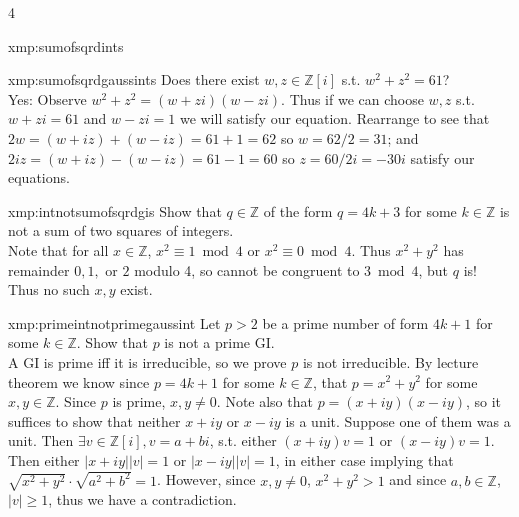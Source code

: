 \documentclass[landscape, 8pt]{extarticle}
\begin{document}
\begin{multicols*}{4}
\begin{xmp}{xmp:sumofsqrdints}{ }
		\end{xmp}
		
		
		\begin{xmp}{xmp:sumofsqrdgaussints}{ }
			Does there exist $w, z\in \mathbb{Z}[i]$ s.t. $w^2 + z^2 = 61$?\\
			Yes: Observe $w^2 + z^2 = (w+zi)(w-zi)$. Thus if we can choose $w, z$ s.t. $w+zi = 61$ and $w-zi = 1$ we will satisfy our equation. Rearrange to see that $2w = (w+iz)+(w-iz) = 61 + 1 = 62$ so $w = 62/2 = 31$; and $2iz = (w+iz) - (w-iz) = 61-1 = 60$ so $z = 60/2i = -30i$ satisfy our equations.
			
		\end{xmp}
		
		
		\begin{xmp-s}{xmp:intnotsumofsqrdgis}{ }
			Show that $q\in \mathbb{Z}$ of the form $q = 4k + 3$ for some $k\in \mathbb{Z}$ is not a sum of two squares of integers.\\
			Note that for all $x\in \mathbb{Z}$, $x^2 \equiv 1 \bmod{4}$ or $x^2 \equiv 0 \bmod{4}$. Thus $x^2 + y^2$ has remainder $0, 1, \text{ or } 2$ modulo 4, so cannot be congruent to $3 \bmod{4}$, but $q$ is! Thus no such $x, y$ exist.
			
		\end{xmp-s}
		
		
		\begin{xmp-s}{xmp:primeintnotprimegaussint}{ }
			Let $p > 2$ be a prime number of form $4k+1$ for some $k\in \mathbb{Z}$. Show that $p$ is not a prime GI.\\
			A GI is prime iff it is irreducible, so we prove $p$ is not irreducible. By lecture theorem we know since $p = 4k+1$ for some $k\in \mathbb{Z}$, that $p = x^2 + y^2$ for some $x, y\in \mathbb{Z}$. Since $p$ is prime, $x, y \ne 0$. Note also that $p = (x+iy)(x-iy)$, so it suffices to show that neither $x+iy$ or $x-iy$ is a unit. Suppose one of them was a unit. Then $\exists v\in \mathbb{Z}[i], v = a+bi$, s.t. either $(x+iy)v = 1$ or $(x-iy)v = 1$. Then either $\left|x+iy\right|\left|v\right| = 1$ or $\left|x-iy\right|\left|v\right|=1$, in either case implying that $\sqrt{x^2 + y^2} \cdot  \sqrt{a^2 +b^2} = 1$. However, since $x, y \ne 0$, $x^2 + y^2 > 1$ and since $a, b\in \mathbb{Z}$, $\left|v\right| \ge 1$, thus we have a contradiction.
			
		\end{xmp-s}
		

\end{multicols*}
\end{document}
